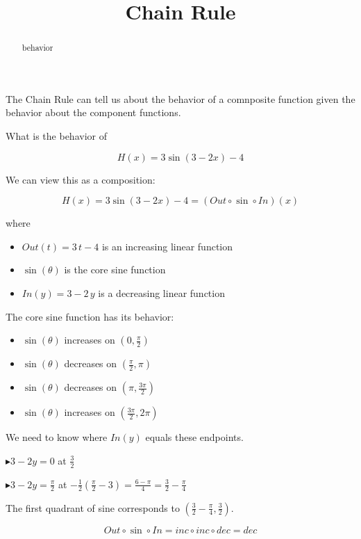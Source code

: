 \documentclass{ximera}
\title{Chain Rule}
\begin{document}
\begin{abstract}
behavior
\end{abstract}
\maketitle




The Chain Rule can tell us about the behavior of a comnposite function given the behavior about the component functions.


What is the behavior of 

\[ H(x) = 3 \sin(3 - 2x)  - 4 \]


We can view this as a composition: 


\[ H(x) = 3 \sin(3 - 2x)  - 4 =   (Out \circ \sin \circ In)(x)\]

where


\begin{itemize}
\item $Out(t) = 3 \, t - 4$ is an increasing linear function
\item $\sin(\theta)$ is the core sine function
\item $In(y) = 3 - 2 \, y$ is a decreasing linear function
\end{itemize}



The core sine function has its behavior:



\begin{itemize}
\item $\sin(\theta)$ increases on $\left( 0, \frac{\pi}{2} \right)$
\item $\sin(\theta)$ decreases on $\left( \frac{\pi}{2}, \pi \right)$
\item $\sin(\theta)$ decreases on $\left( \pi, \frac{3\pi}{2} \right)$
\item $\sin(\theta)$ increases on $\left( \frac{3\pi}{2}, 2\pi \right)$
\end{itemize}



We need to know where $In(y)$ equals these endpoints.



$\blacktriangleright 3 - 2y = 0$ at $\frac{3}{2}$

$\blacktriangleright 3 - 2y = \frac{\pi}{2}$ at $-\frac{1}{2}(\frac{\pi}{2} - 3) = \frac{6-\pi}{4} = \frac{3}{2} - \frac{\pi}{4}$


\begin{center}
The first quadrant of sine corresponds to $\left( \frac{3}{2} - \frac{\pi}{4}, \frac{3}{2} \right)$.

\[ Out \circ \sin \circ In = inc \circ inc \circ dec = dec \]
\end{center}
\end{document}

